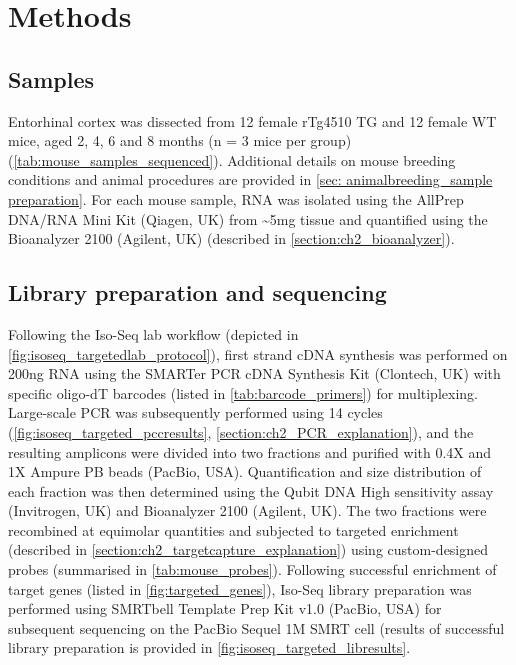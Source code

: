\restoregeometry

 

\section{Methods}

\subsection{Samples}
Entorhinal cortex was dissected from 12 female rTg4510 TG and 12 female WT mice, aged 2, 4, 6 and 8 months (n = 3 mice per group) (\cref{tab:mouse_samples_sequenced}). Additional details on mouse breeding conditions and animal procedures are provided in \cref{sec: animalbreeding_sample preparation}. For each mouse sample, RNA was isolated using the AllPrep DNA/RNA Mini Kit (Qiagen, UK) from \textasciitilde5mg tissue and quantified using the Bioanalyzer 2100 (Agilent, UK) (described in \cref{section:ch2_bioanalyzer}). 
 
\subsection{Library preparation and sequencing}
Following the Iso-Seq lab workflow (depicted in \cref{fig:isoseq_targetedlab_protocol}), first strand cDNA synthesis was performed on 200ng RNA using the SMARTer PCR cDNA Synthesis Kit (Clontech, UK) with specific oligo-dT barcodes (listed in \cref{tab:barcode_primers}) for multiplexing. Large-scale PCR was subsequently performed using 14 cycles (\cref{fig:isoseq_targeted_pccresults}, \cref{section:ch2_PCR_explanation}), and the resulting amplicons were divided into two fractions and purified with 0.4X and 1X Ampure PB beads (PacBio, USA). Quantification and size distribution of each fraction was then determined using the Qubit DNA High sensitivity assay (Invitrogen, UK) and Bioanalyzer 2100 (Agilent, UK). The two fractions were recombined at equimolar quantities and subjected to targeted enrichment (described in \cref{section:ch2_targetcapture_explanation}) using custom-designed probes (summarised in \cref{tab:mouse_probes}). Following successful enrichment of target genes (listed in \cref{fig:targeted_genes}), Iso-Seq library preparation was performed using SMRTbell Template Prep Kit v1.0 (PacBio, USA) for subsequent sequencing on the PacBio Sequel 1M SMRT cell (results of successful library preparation is provided in \cref{fig:isoseq_targeted_libresults}. 

